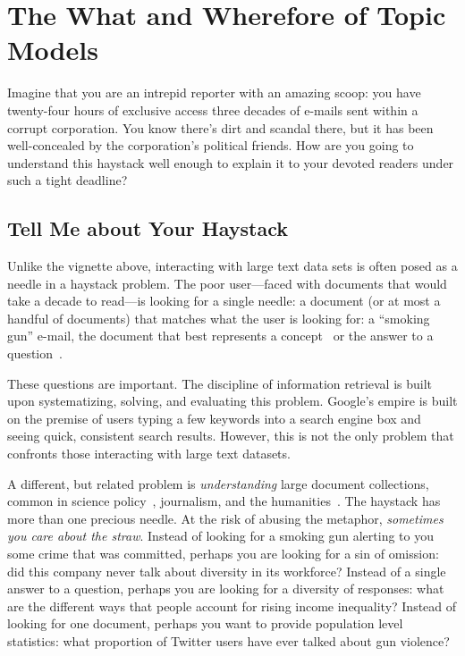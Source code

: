 
\chapter{The What and Wherefore of Topic Models}
\label{ch:intro}

Imagine that you are an intrepid reporter with an amazing scoop: you have
twenty-four hours of exclusive access three decades of e-mails sent within a
corrupt corporation.  You know there's dirt and scandal there, but it has been
well-concealed by the corporation's political friends.  How are you going to
understand this haystack well enough to explain it to your devoted readers under
such a tight deadline?

\section{Tell Me about Your Haystack}

Unlike the vignette above, interacting with large text data sets is often posed
as a needle in a haystack problem.  The poor user---faced with documents that
would take a decade to read---is looking for a single needle: a document (or at
most a handful of documents) that matches what the user is looking
for: a ``smoking gun'' e-mail, the document that best represents a
concept~\citep{Salton-68} or the answer to a question~\citep{Hirschman-01}.

These questions are important.  The discipline of information retrieval is
built upon systematizing, solving, and evaluating this problem.  Google's empire
is built on the premise of users typing a few keywords into a search engine box
and seeing quick, consistent search results.  However, this is not the only
problem that confronts those interacting with large text datasets.

A different, but related problem is \emph{understanding} large
document collections, common in science policy~\citep{talley-11},
journalism, and the humanities~\citep{moretti-13}.  The haystack has
more than one precious needle.  At the risk of abusing the metaphor,
\emph{sometimes you care about the straw}.  Instead of looking for a
smoking gun alerting to you some crime that was committed, perhaps you
are looking for a sin of omission: did this company never talk about
diversity in its workforce?  Instead of a single answer to a question,
perhaps you are looking for a diversity of responses: what are the
different ways that people account for rising income inequality?
Instead of looking for one document, perhaps you want to provide
population level statistics: what proportion of Twitter users have
ever talked about gun violence?

